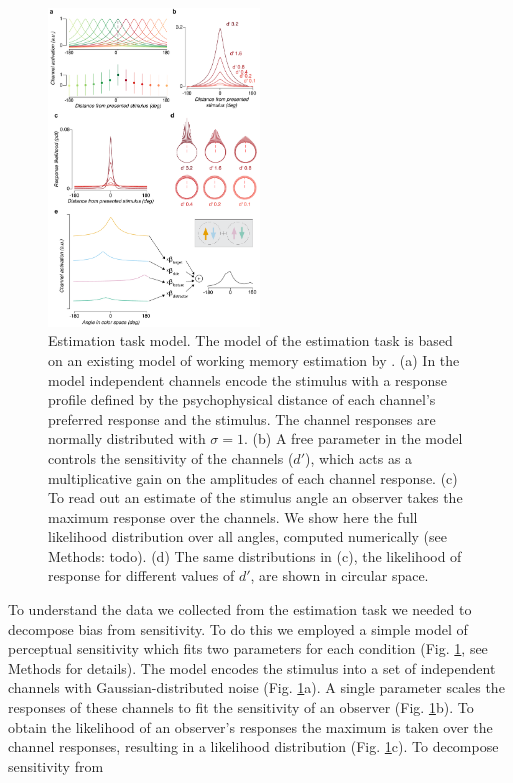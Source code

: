 \begin{figure}
\centering
\includegraphics[keepaspectratio,width=0.5\textwidth]{figs_c4/f3_TCC_model.pdf}
\caption[Estimation task model]{Estimation task model. The model of the estimation task is based on an existing model of working memory estimation by \citet{Schurgin2018-vi}. (a) In the model independent channels encode the stimulus with a response profile defined by the psychophysical distance of each channel's preferred response and the stimulus. The channel responses are normally distributed with $\sigma=1$. (b) A free parameter in the model controls the sensitivity of the channels ($d'$), which acts as a multiplicative gain on the amplitudes of each channel response. (c) To read out an estimate of the stimulus angle an observer takes the maximum response over the channels. We show here the full likelihood distribution over all angles, computed numerically (see Methods: todo). (d) The same distributions in (c), the likelihood of response for different values of $d'$, are shown in circular space.}
\label{fig:c4f5}
\end{figure}

To understand the data we collected from the estimation task we needed to decompose bias from sensitivity. To do this we employed a simple model of perceptual sensitivity which fits two parameters for each condition (Fig. \ref{fig:c4f5}, see Methods for details). The model encodes the stimulus into a set of independent channels with Gaussian-distributed noise (Fig. \ref{fig:c4f5}a). A single parameter scales the responses of these channels to fit the sensitivity of an observer (Fig. \ref{fig:c4f5}b). To obtain the likelihood of an observer's responses the maximum is taken over the channel responses, resulting in a likelihood distribution (Fig. \ref{fig:c4f5}c). To decompose sensitivity from 

